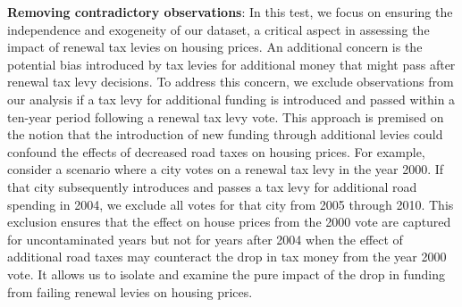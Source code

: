\textbf{Removing contradictory observations}: In this test, we focus on ensuring the independence and exogeneity of our dataset, a critical aspect in assessing the impact of renewal tax levies on housing prices. An additional concern is the potential bias introduced by tax levies for additional money that might pass after renewal tax levy decisions.
To address this concern, we exclude observations from our analysis if a tax levy for additional funding is introduced and passed within a ten-year period following a renewal tax levy vote. This approach is premised on the notion that the introduction of new funding through additional levies could confound the effects of decreased road taxes on housing prices. 
For example, consider a scenario where a city votes on a renewal tax levy in the year 2000. If that city subsequently introduces and passes a tax levy for additional road spending in 2004, we exclude all votes for that city from 2005 through 2010. This exclusion ensures that the effect on house prices from the 2000 vote are captured for uncontaminated years but not for years after 2004 when the effect of additional road taxes may counteract the drop in tax money from the year 2000 vote. It allows us to isolate and examine the pure impact of the drop in funding from failing renewal levies on housing prices. 

